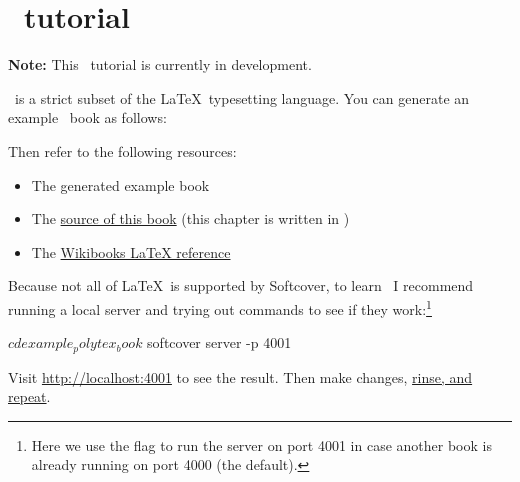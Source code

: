 \chapter{\PolyTeX\ tutorial} %
\label{cha:polytex_tutorial}

\noindent \textbf{Note:} This \PolyTeX\ tutorial is currently in development.

\PolyTeX\ is a strict subset of the \LaTeX\ typesetting language. You can generate an example \PolyTeX\ book as follows:


\noindent Then refer to the following resources:

\begin{itemize}
\item The generated example book
\item The \href{https://github.com/softcover/softcover_book}{source of this book} (this chapter is written in \PolyTeX)
\item The \href{http://en.wikibooks.org/wiki/LaTeX}{Wikibooks LaTeX reference}
\end{itemize}

Because not all of \LaTeX\ is supported by Softcover, to learn \PolyTeX\ I recommend running a local server and trying out commands to see if they work:\footnote{Here we use the  flag to run the server on port 4001 in case another book is already running on port 4000 (the default).}

\begin{code}
$ cd example_polytex_book
$ softcover server -p 4001
\end{code}

\noindent Visit \href{http://localhost:4001}{http://localhost:4001} to see the result. Then make changes, \href{http://www.urbandictionary.com/define.php?term=rinse%20repeat}{rinse, and repeat}.

